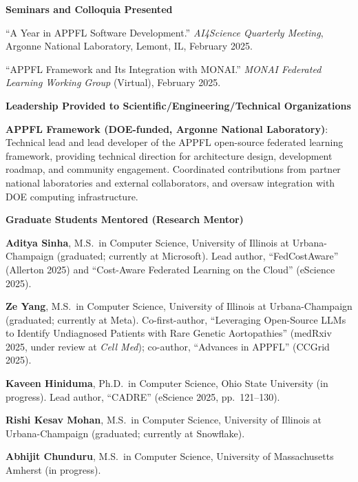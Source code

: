 \documentclass[letterpaper,11pt]{article}
\newcommand{\PubSection}[1]{%
  \vspace{6pt}\noindent\textbf{#1}\vspace{3pt}%
}
\begin{document}
\PubSection{Seminars and Colloquia Presented}
\begin{enumerate}[leftmargin=1cm, label={[\arabic*]}, itemsep=3pt]
  \small
  \item ``A Year in APPFL Software Development.'' \textit{AI4Science Quarterly Meeting}, Argonne National Laboratory, Lemont, IL, February 2025.

  \item ``APPFL Framework and Its Integration with MONAI.'' \textit{MONAI Federated Learning Working Group} (Virtual), February 2025.
\end{enumerate}


\PubSection{Leadership Provided to Scientific/Engineering/Technical Organizations}
\begin{enumerate}[leftmargin=1cm, label={[\arabic*]}, itemsep=3pt]
  \small
  \item \textbf{APPFL Framework (DOE-funded, Argonne National Laboratory)}: Technical lead and lead developer of the APPFL open-source federated learning framework, providing technical direction for architecture design, development roadmap, and community engagement. Coordinated contributions from partner national laboratories and external collaborators, and oversaw integration with DOE computing infrastructure.
\end{enumerate}

\PubSection{Graduate Students Mentored (Research Mentor)}
\begin{enumerate}[leftmargin=1cm, label={[\arabic*]}, itemsep=3pt]
  \small
  \item \textbf{Aditya Sinha}, M.S.\ in Computer Science, University of Illinois at Urbana-Champaign (graduated; currently at Microsoft). Lead author, ``FedCostAware'' (Allerton 2025) and ``Cost-Aware Federated Learning on the Cloud'' (eScience 2025).

  \item \textbf{Ze Yang}, M.S.\ in Computer Science, University of Illinois at Urbana-Champaign (graduated; currently at Meta). Co-first-author, ``Leveraging Open-Source LLMs to Identify Undiagnosed Patients with Rare Genetic Aortopathies'' (medRxiv 2025, under review at \textit{Cell Med}); co-author, ``Advances in APPFL'' (CCGrid 2025).

  \item \textbf{Kaveen Hiniduma}, Ph.D.\ in Computer Science, Ohio State University (in progress). Lead author, ``CADRE'' (eScience 2025, pp.\ 121--130).

  \item \textbf{Rishi Kesav Mohan}, M.S.\ in Computer Science, University of Illinois at Urbana-Champaign (graduated; currently at Snowflake).

  \item \textbf{Abhijit Chunduru}, M.S.\ in Computer Science, University of Massachusetts Amherst (in progress).
\end{enumerate}
\end{document}
